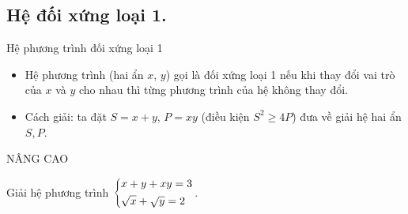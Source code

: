 \subsection{Hệ đối xứng loại 1.}
\begin{dang}{Hệ phương trình đối xứng loại 1}
\begin{itemize}
\item Hệ phương trình (hai ẩn $x$, $y$) gọi là đối xứng loại 1 nếu khi thay đổi vai trò của $x$ và $y$ cho nhau thì từng phương trình của hệ không thay đổi.
\item Cách giải: ta đặt $S=x+y$, $P=xy$ (điều kiện $S^{2}\geq 4P$) đưa về giải hệ hai ẩn $S,P$.
\end{itemize}
\end{dang}
\begin{center}
	NÂNG CAO
\end{center}
\begin{ex}%
Giải hệ phương trình $\left\{\begin{aligned}&x+y+xy=3\\ &\sqrt{x}+\sqrt{y}=2\end{aligned}\right.$.
\end{ex}
